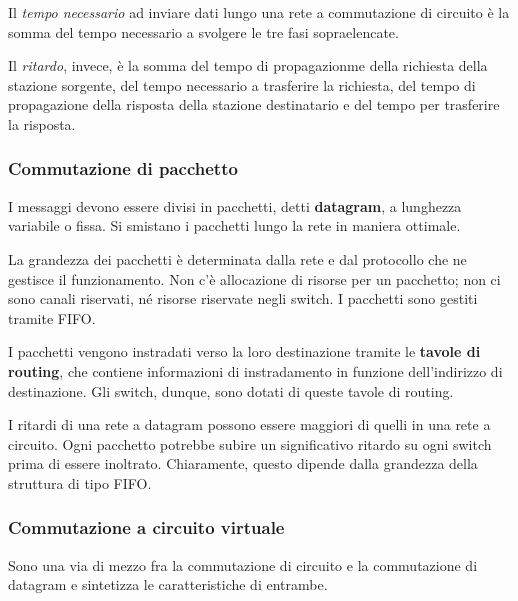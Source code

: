             Il \textit{tempo necessario} ad inviare dati lungo una rete a commutazione di circuito è la somma del tempo necessario a svolgere le tre fasi sopraelencate. 
            
            Il \textit{ritardo}, invece, è la somma del tempo di propagazionme della richiesta della stazione sorgente, del tempo necessario a trasferire la richiesta, del tempo di propagazione della risposta della stazione destinatario e del tempo per trasferire la risposta.
            
        \subsubsection{Commutazione di pacchetto}
        
            I messaggi devono essere divisi in pacchetti, detti \textbf{datagram}, a lunghezza variabile o fissa. Si smistano i pacchetti lungo la rete in maniera ottimale.
            
            La grandezza dei pacchetti è determinata dalla rete e dal protocollo che ne gestisce il funzionamento. Non c'è allocazione di risorse per un pacchetto; non ci sono canali riservati, né risorse riservate negli switch. I pacchetti sono gestiti tramite FIFO.
            
            \vspace{3mm}
            
            I pacchetti vengono instradati verso la loro destinazione tramite le \textbf{tavole di routing}, che contiene informazioni di instradamento in funzione dell'indirizzo di destinazione. Gli switch, dunque, sono dotati di queste tavole di routing.
            
            \vspace{3mm}
            
            I ritardi di una rete a datagram possono essere maggiori di quelli in una rete a circuito. Ogni pacchetto potrebbe subire un significativo ritardo su ogni switch prima di essere inoltrato. Chiaramente, questo dipende dalla grandezza della struttura di tipo FIFO.
            
        \subsubsection{Commutazione a circuito virtuale}
        
            Sono una via di mezzo fra la commutazione di circuito e la commutazione di datagram e sintetizza le caratteristiche di entrambe.
            
